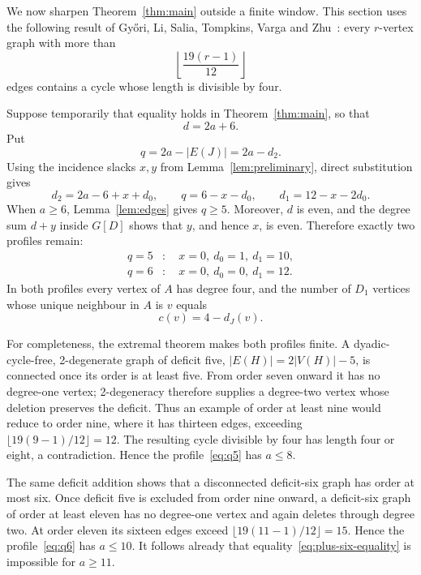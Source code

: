 \documentclass[11pt]{article}
\begin{document}
We now sharpen Theorem~\ref{thm:main} outside a finite window.  This section
uses the following result of Gy\H{o}ri, Li, Salia, Tompkins, Varga and
Zhu~\cite{GLSTVZ2026}: every $r$-vertex graph with more than
\[
 \left\lfloor\frac{19(r-1)}{12}\right\rfloor
\]
edges contains a cycle whose length is divisible by four.

Suppose temporarily that equality holds in Theorem~\ref{thm:main}, so that
\begin{equation}\label{eq:plus-six-equality}
 d=2a+6.
\end{equation}
Put
\[
 q=2a-|E(J)|=2a-d_2.
\]
Using the incidence slacks $x,y$ from Lemma~\ref{lem:preliminary}, direct
substitution gives
\begin{equation}\label{eq:q-six-profiles}
 d_2=2a-6+x+d_0,\qquad
 q=6-x-d_0,\qquad
 d_1=12-x-2d_0.
\end{equation}
When $a\ge6$, Lemma~\ref{lem:edges} gives $q\ge5$.  Moreover, $d$ is even,
and the degree sum $d+y$ inside $G[D]$ shows that $y$, and hence $x$, is
even.  Therefore exactly two profiles remain:
\begin{align}
 q=5 &: \quad x=0,\ d_0=1,\ d_1=10,\label{eq:q5}\\
 q=6 &: \quad x=0,\ d_0=0,\ d_1=12.\label{eq:q6}
\end{align}
In both profiles every vertex of $A$ has degree four, and the number of
$D_1$ vertices whose unique neighbour in $A$ is $v$ equals
\begin{equation}\label{eq:colour-multiplicity}
 c(v)=4-d_J(v).
\end{equation}

For completeness, the extremal theorem makes both profiles finite.  A
dyadic-cycle-free, 2-degenerate graph of deficit five,
$|E(H)|=2|V(H)|-5$, is connected once its order is at least five.  From
order seven onward it has no degree-one vertex; 2-degeneracy therefore
supplies a degree-two vertex whose deletion preserves the deficit.  Thus an
example of order at least nine would reduce to order nine, where it has
thirteen edges, exceeding
$\lfloor19(9-1)/12\rfloor=12$.  The resulting cycle divisible by four has
length four or eight, a contradiction.  Hence the profile~\eqref{eq:q5}
has $a\le8$.

The same deficit addition shows that a disconnected deficit-six graph has
order at most six.  Once deficit five is excluded from order nine onward, a
deficit-six graph of order at least eleven has no degree-one vertex and
again deletes through degree two.  At order eleven its sixteen edges exceed
$\lfloor19(11-1)/12\rfloor=15$.  Hence the profile~\eqref{eq:q6} has
$a\le10$.  It follows already that equality~\eqref{eq:plus-six-equality} is
impossible for $a\ge11$.
\end{document}
